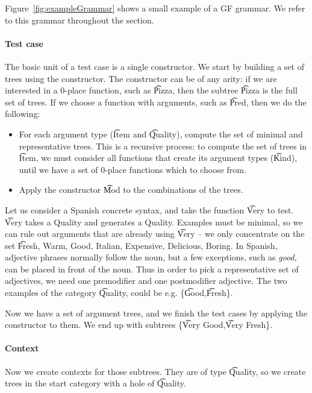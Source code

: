 Figure~\ref{fig:exampleGrammar} shows a small example of a GF grammar. We refer to this grammar throughout the section.

\paragraph{Test case} 
The basic unit of a test case is a single constructor. 
We start by building a set of trees using the constructor.
The constructor can be of any arity: if we are interested in a 0-place function, such as \t{Pizza}, then the subtree \t{Pizza} is the full set of trees. If we choose a function with arguments, such as \t{Pred}, then we do the following:
\begin{itemize}
\item For each argument type (\t{Item} and \t{Quality}), compute the set of minimal and representative trees. This is a recursive process: to compute the set of trees in \t{Item}, we must consider all functions that create its argument types (\t{Kind}), until we have a set of 0-place functions which to choose from.
\item Apply the constructor \t{Mod} to the combinations of the trees.
\end{itemize}

Let us consider a Spanish concrete syntax, and take the function \t{Very} to test.
\t{Very} takes a Quality and generates a Quality.
Examples must be minimal, so we can rule out arguments that are already using \t{Very} -- we only concentrate on the set \t{Fresh, Warm, Good, Italian, Expensive, Delicious, Boring}. 
In Spanish, adjective phrases normally follow the noun, but a few exceptions, such as \emph{good}, can be placed in front of the noun. Thus in order to pick a representative set of adjectives, we need one premodifier and one postmodifier adjective. The two examples of the category \t{Quality}, could be e.g. \{\t{Good},\t{Fresh}\}.

Now we have a set of argument trees, and we finish the test cases by applying the constructor to them. We end up with subtrees \{\t{Very Good},\t{Very Fresh}\}.


\paragraph{Context} 

Now we create contexts for those subtrees. They are of type \t{Quality}, so we create trees in the start category with a hole of \t{Quality}.

